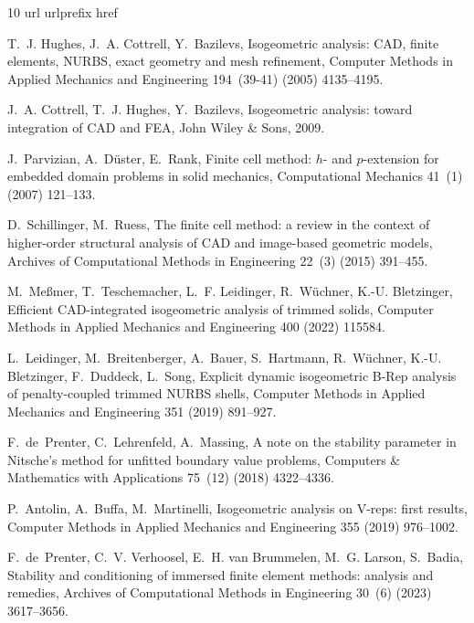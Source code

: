 \documentclass{article}
\numberwithin{equation}{section}
\theoremstyle{definition}
\begin{document}
\begin{thebibliography}{10}
\expandafter\ifx\csname url\endcsname\relax
  \def\url#1{\texttt{#1}}\fi
\expandafter\ifx\csname urlprefix\endcsname\relax\def\urlprefix{URL }\fi
\expandafter\ifx\csname href\endcsname\relax
  \def\href#1#2{#2} \def\path#1{#1}\fi

T.~J. Hughes, J.~A. Cottrell, Y.~Bazilevs, Isogeometric analysis: {CAD}, finite elements, {NURBS}, exact geometry and mesh refinement, Computer Methods in Applied Mechanics and Engineering 194~(39-41) (2005) 4135--4195.

J.~A. Cottrell, T.~J. Hughes, Y.~Bazilevs, Isogeometric analysis: toward integration of {CAD} and {FEA}, John Wiley \& Sons, 2009.

J.~Parvizian, A.~D{\"u}ster, E.~Rank, Finite cell method: $h$- and $p$-extension for embedded domain problems in solid mechanics, Computational Mechanics 41~(1) (2007) 121--133.

D.~Schillinger, M.~Ruess, The finite cell method: a review in the context of higher-order structural analysis of {CAD} and image-based geometric models, Archives of Computational Methods in Engineering 22~(3) (2015) 391--455.

M.~Me{\ss}mer, T.~Teschemacher, L.~F. Leidinger, R.~W{\"u}chner, K.-U. Bletzinger, Efficient {CAD}-integrated isogeometric analysis of trimmed solids, Computer Methods in Applied Mechanics and Engineering 400 (2022) 115584.

L.~Leidinger, M.~Breitenberger, A.~Bauer, S.~Hartmann, R.~W{\"u}chner, K.-U. Bletzinger, F.~Duddeck, L.~Song, Explicit dynamic isogeometric {B-Rep} analysis of penalty-coupled trimmed {NURBS} shells, Computer Methods in Applied Mechanics and Engineering 351 (2019) 891--927.

F.~de~Prenter, C.~Lehrenfeld, A.~Massing, A note on the stability parameter in {Nitsche}'s method for unfitted boundary value problems, Computers \& Mathematics with Applications 75~(12) (2018) 4322--4336.

P.~Antolin, A.~Buffa, M.~Martinelli, Isogeometric analysis on {V}-reps: first results, Computer Methods in Applied Mechanics and Engineering 355 (2019) 976--1002.

F.~de~Prenter, C.~V. Verhoosel, E.~H. van Brummelen, M.~G. Larson, S.~Badia, Stability and conditioning of immersed finite element methods: analysis and remedies, Archives of Computational Methods in Engineering 30~(6) (2023) 3617--3656.


\end{thebibliography}
\end{document}
